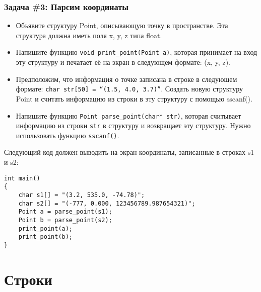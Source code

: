 \documentclass{article}
\begin{document}
\subsubsection*{\Squarepipe \quad Задача \#3: Парсим координаты}
\begin{itemize}
\item Объявите структуру Point, описывающую точку в пространстве. Эта структура должна иметь поля x, y, z типа float. 
\item Напишите функцию \texttt{void print\_point(Point a)}, которая принимает на вход эту структуру и печатает её на экран в следующем формате: (x, y, z).
\item Предположим, что информация о точке записана в строке в следующем формате: \texttt{char str[50] = ``(1.5, 4.0, 3.7)''}. Создать новую структуру Point и считать информацию из строки в эту структуру с помощью sscanf().
\item Напишите функцию \texttt{Point parse\_point(char* str)}, которая считывает информацию из строки \texttt{str} в структуру и возвращает эту структуру. Нужно использовать функцию \texttt{sscanf()}.
\end{itemize}
Следующий код должен выводить на экран координаты, записанные в строках s1 и s2:
\begin{lstlisting}
int main()
{
    char s1[] = "(3.2, 535.0, -74.78)";
    char s2[] = "(-777, 0.000, 123456789.987654321)";
    Point a = parse_point(s1);
    Point b = parse_point(s2);
    print_point(a);
    print_point(b);
}
\end{lstlisting}
\newpage
\section*{Строки}
\end{document}
